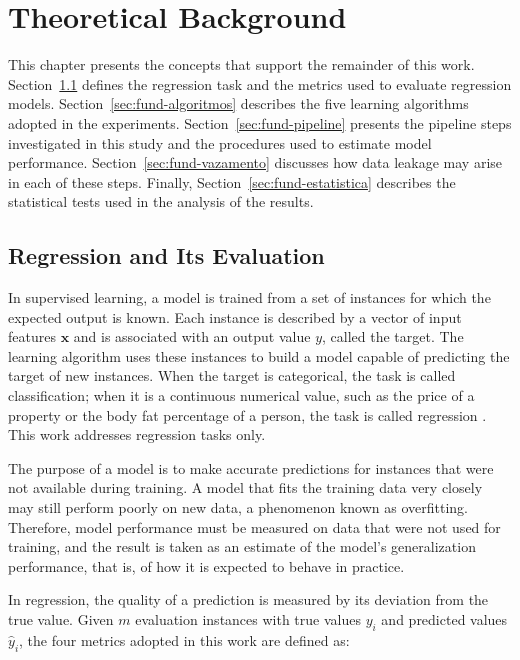\chapter{Theoretical Background}
\label{cap:fundamentacao}

This chapter presents the concepts that support the remainder of this work.
Section~\ref{sec:fund-regressao} defines the regression task and the metrics
used to evaluate regression models. Section~\ref{sec:fund-algoritmos} describes
the five learning algorithms adopted in the experiments.
Section~\ref{sec:fund-pipeline} presents the pipeline steps investigated in this
study and the procedures used to estimate model performance.
Section~\ref{sec:fund-vazamento} discusses how data leakage may arise in each of
these steps. Finally, Section~\ref{sec:fund-estatistica} describes the
statistical tests used in the analysis of the results.

\section{Regression and Its Evaluation}
\label{sec:fund-regressao}

In supervised learning, a model is trained from a set of instances for which the
expected output is known. Each instance is described by a vector of input
features $\mathbf{x}$ and is associated with an output value $y$, called the
target. The learning algorithm uses these instances to build a model capable of
predicting the target of new instances. When the target is categorical, the task
is called classification; when it is a continuous numerical value, such as the
price of a property or the body fat percentage of a person, the task is called
regression \cite{hastie2009}. This work addresses regression tasks only.

The purpose of a model is to make accurate predictions for instances that were
not available during training. A model that fits the training data very closely
may still perform poorly on new data, a phenomenon known as overfitting.
Therefore, model performance must be measured on data that were not used for
training, and the result is taken as an estimate of the model's generalization
performance, that is, of how it is expected to behave in practice.

In regression, the quality of a prediction is measured by its deviation from the
true value. Given $m$ evaluation instances with true values $y_i$ and predicted
values $\hat{y}_i$, the four metrics adopted in this work are defined as:

